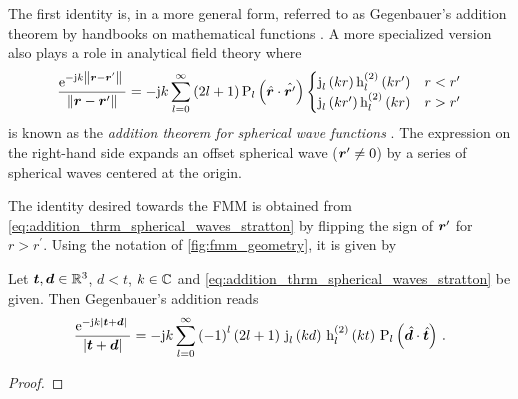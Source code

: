 The first identity is, in a more general form, referred to as Gegenbauer's
addition theorem by handbooks on mathematical functions
\cite[eq. 10.23.8]{Olver2010} \cite[9.1.80]{Abramowitz2014}.
A more specialized version also plays a role in analytical field theory where
\cite[p.~414]{Stratton2007}
\begin{equation}\label{eq:addition_thrm_spherical_waves_stratton}
	\frac{\exp{-\im k \rdiffNorm}}{\rdiffNorm} =
	-\im k \sum\limits_{l=0}^{\infty}
	\left(2l + 1\right)
	\legendrepl{l} \left( \uv{r} \cdot \uv{r^\prime} \right)
	\begin{cases}
		\sphbesselj{l}    \left( k r        \right)
		\sphbesselh{2}{l} \left( k r^\prime \right)
		& r < r^\prime \\
		\sphbesselj{l}    \left( k r^\prime \right)
		\sphbesselh{2}{l} \left( k r        \right)
		& r > r^\prime
	\end{cases}
\end{equation}
is known as the \emph{addition theorem for spherical wave functions}
\cite[p.~362]{Jin2015}.
The expression on the right-hand side expands an offset spherical wave
($\rsrc \neq 0$) by a series of spherical waves centered at the origin.

The identity desired towards the \ac{FMM} is obtained from
\eqref{eq:addition_thrm_spherical_waves_stratton} by flipping the sign of 
$\rsrc$ for $r > r^\prime$.
Using the notation of \cref{fig:fmm_geometry}, it is given by
\begin{corollary}
	Let $\pvec{t}, \pvec{d} \in \R^3$, $d < t$, $k \in \mathbb{C}$ and
	\eqref{eq:addition_thrm_spherical_waves_stratton} be given.
	Then Gegenbauer's addition reads
	\begin{equation}\label{eq:fmm_std_gegenbauer}
		\frac{\exp{-\im k \abs{\pvec{t} + \pvec{d}}}}{\abs{\pvec{t} + \pvec{d}}} = 
		-\im k \sum\limits_{l=0}^{\infty}
		\left( -1 \right)^l
		\left( 2l + 1 \right) \,
		\sphbesselj{l} \left( k d  \right) \,
		\sphbesselh{2}{l} \left( k t \right) \, 
		\legendrepl{l} \left( \uv{d} \cdot \uv{t} \right) \, .
	\end{equation}
\end{corollary} 

\begin{proof}
\end{proof}

